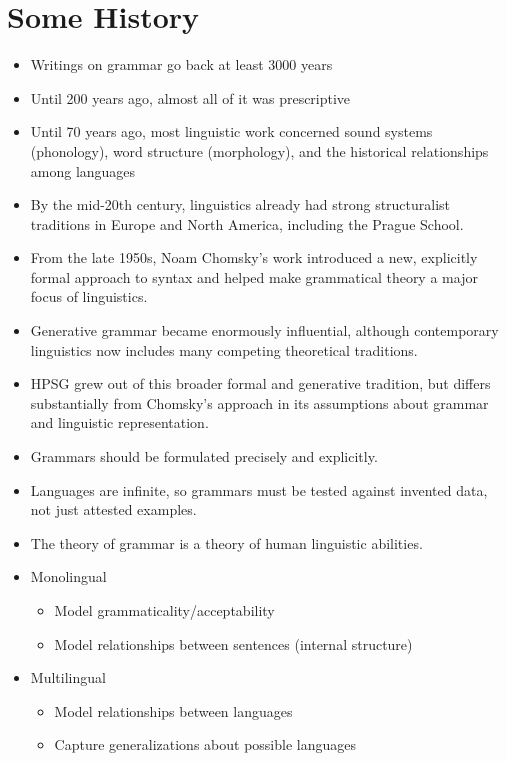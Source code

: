 \documentclass[a4paper,landscape,headrule,footrule]{foils}
\begin{document}
\section{Some History}

\begin{itemize}
\item Writings on grammar go back at least 3000 years
\item Until 200 years ago, almost all of it was prescriptive
\item Until 70 years ago, most linguistic work concerned sound systems (phonology),
word structure (morphology), and the historical relationships among
languages
\end{itemize}

\begin{itemize}
\item By the mid-20th century, linguistics already had strong
structuralist traditions in Europe and North America,
including the Prague School.

\item From the late 1950s, Noam Chomsky’s work introduced
a new, explicitly formal approach to syntax and helped
make grammatical theory a major focus of linguistics.

\item Generative grammar became enormously influential,
although contemporary linguistics now includes many
competing theoretical traditions.

\item HPSG grew out of this broader formal and generative
tradition, but differs substantially from Chomsky’s
approach in its assumptions about grammar and
linguistic representation.
\end{itemize}

\begin{itemize}
\item Grammars should be formulated precisely
and explicitly.
\item Languages are infinite, so grammars must be
tested against invented data, not just attested
examples.
\item The theory of grammar is a theory of human
linguistic abilities.
\end{itemize}

\begin{itemize}
\item Monolingual
\begin{itemize}
\item Model grammaticality/acceptability
\item Model relationships between sentences
(internal structure)
\end{itemize}
\item Multilingual
\begin{itemize}
\item Model relationships between languages
\item Capture generalizations about possible
languages
\end{itemize}
\end{itemize}
\end{document}
